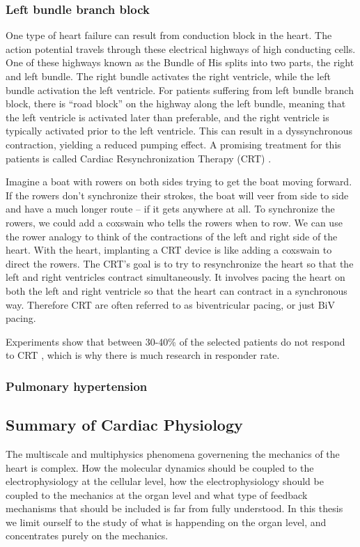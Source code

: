 \subsubsection{Left bundle branch block}

One type of heart failure can result from conduction block in the
heart. The action potential travels through these electrical highways
of high conducting cells. One of these highways known as the Bundle of
His splits into two parts, the right and left bundle. The right bundle
activates the right ventricle, while the left bundle activation the
left ventricle. For patients suffering from left bundle branch block,
there is ``road block'' on the highway along the left bundle, meaning
that the left ventricle is activated later than preferable, and the
right ventricle is typically activated prior to the left
ventricle. This can result in a dyssynchronous contraction, yielding a
reduced pumping effect. A promising treatment for this patients is
called Cardiac Resynchronization Therapy (CRT) \cite{cleland2005effect}.

Imagine a boat with rowers on both sides trying to get the boat moving
forward. If the rowers don’t synchronize their strokes, the boat will
veer from side to side and have a much longer route – if it gets
anywhere at all. To synchronize the rowers, we could add a coxswain
who tells the rowers when to row. We can use the rower analogy to
think of the contractions of the left and right side of the
heart. With the heart, implanting a CRT device is like adding a
coxswain to direct the rowers. The CRT’s goal is to try to
resynchronize the heart so that the left and right ventricles contract
simultaneously. It involves pacing the heart on both the left and
right ventricle so that the heart can contract in a synchronous
way. Therefore CRT are often referred to as biventricular pacing, or
just BiV pacing.

Experiments show that between 30-40\% of the selected patients do
not respond to CRT \cite{daubert20122012}, which is why there is much
research in  responder rate. 



\subsubsection{Pulmonary hypertension}


\subsection{Summary of Cardiac Physiology}
The multiscale and multiphysics phenomena governening the mechanics of
the heart is complex. How the molecular dynamics should be coupled to
the electrophysiology at the cellular level, how the electrophysiology
should be coupled to the mechanics at the organ level and what type of
feedback mechanisms that should be included is far from fully
understood. In this thesis we limit ourself to the study of what is
happending on the organ level, and concentrates purely on the
mechanics. 


